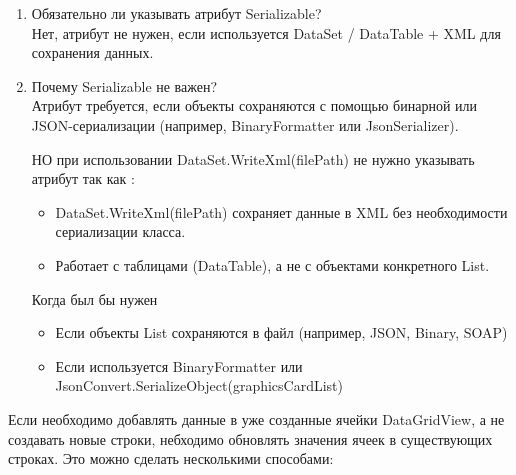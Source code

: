 \documentclass[12pt]{article}
\renewcommand{\texttt}[1]{{\small\ttfamily #1}}
\numberwithin{listing}{section}
\numberwithin{figure}{section}
\begin{document}
\begin{enumerate}
	\item Обязательно ли указывать атрибут Serializable? \\
	      Нет, атрибут \texttt{[Serializable]} не нужен, если используется \texttt{DataSet} / \texttt{DataTable} + XML для сохранения данных.

	\item Почему Serializable не важен? \\
	      Атрибут \texttt{[Serializable]} требуется, если объекты сохраняются с помощью бинарной или JSON-сериализации (например, \texttt{BinaryFormatter} или \texttt{JsonSerializer}).

	      \textcolor{CtpRed}{НО} при использовании \texttt{DataSet.WriteXml(filePath)} не нужно указывать атрибут так как :
	      \begin{itemize}
		      \item \texttt{DataSet.WriteXml(filePath)} сохраняет данные в XML без необходимости сериализации класса.
		      \item Работает с таблицами (\texttt{DataTable}), а не с объектами конкретного \texttt{List}.
	      \end{itemize}

	      Когда \texttt{[Serializable]} был бы нужен
	      \begin{itemize}
		      \item Если объекты List сохраняются в файл (например, JSON, Binary, SOAP)
		      \item Если используется \texttt{BinaryFormatter} или \texttt{JsonConvert.\-Serialize\-Object(graphics\-Card\-List)}
	      \end{itemize}
\end{enumerate}

Если необходимо добавлять данные в уже созданные ячейки \texttt{DataGridView}, а не создавать новые строки, небходимо обновлять значения ячеек в существующих строках. Это можно сделать несколькими способами:
\end{document}
